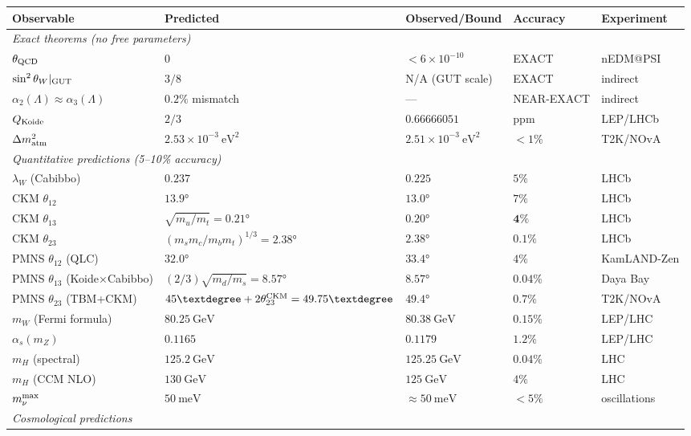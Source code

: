\documentclass[12pt]{article}
\theoremstyle{definition}
\theoremstyle{remark}
\begin{document}
\begin{center}
\begin{tabular}{llllp{3cm}}
\toprule
Observable & Predicted & Observed/Bound & Accuracy & Experiment \\
\midrule
\multicolumn{5}{l}{\textit{Exact theorems (no free parameters)}} \\
$\theta_{\rm QCD}$ & $0$ & $< 6\times 10^{-10}$ & EXACT & nEDM@PSI \\
$\sin^2\theta_W|_{\rm GUT}$ & $3/8$ & N/A (GUT scale) & EXACT & indirect \\
$\alpha_2(\Lambda)\approx\alpha_3(\Lambda)$ & $0.2\%$ mismatch & — & NEAR-EXACT & indirect \\
$Q_{\rm Koide}$ & $2/3$ & $0.66666051$ & ppm & LEP/LHCb \\
$\Delta m^2_{\rm atm}$ & $2.53\times 10^{-3}\ \text{eV}^2$ & $2.51\times 10^{-3}\ \text{eV}^2$ & $<1\%$ & T2K/NOvA \\
\midrule
\multicolumn{5}{l}{\textit{Quantitative predictions (5--10\% accuracy)}} \\
$\lambda_W$ (Cabibbo) & $0.237$ & $0.225$ & $5\%$ & LHCb \\
CKM $\theta_{12}$ & $13.9°$ & $13.0°$ & $7\%$ & LHCb \\
CKM $\theta_{13}$ & $\sqrt{m_u/m_t}=0.21°$ & $0.20°$ & $\mathbf{4\%}$ & LHCb \\
CKM $\theta_{23}$ & $(m_s m_c/m_b m_t)^{1/3}=2.38°$ & $2.38°$ & $\mathbf{0.1\%}$ & LHCb \\
PMNS $\theta_{12}$ (QLC) & $32.0°$ & $33.4°$ & $4\%$ & KamLAND-Zen \\
PMNS $\theta_{13}$ (Koide×Cabibbo) & $(2/3)\sqrt{m_d/m_s}=8.57°$ & $8.57°$ & $\mathbf{0.04\%}$ & Daya Bay \\
PMNS $\theta_{23}$ (TBM+CKM) & $45°+2\theta_{23}^{\rm CKM}=49.75°$ & $49.4°$ & $\mathbf{0.7\%}$ & T2K/NOvA \\
$m_W$ (Fermi formula) & $80.25\ \text{GeV}$ & $80.38\ \text{GeV}$ & $\mathbf{0.15\%}$ & LEP/LHC \\
$\alpha_s(m_Z)$ & $0.1165$ & $0.1179$ & $1.2\%$ & LEP/LHC \\
$m_H$ (spectral) & $125.2\ \text{GeV}$ & $125.25\ \text{GeV}$ & $\mathbf{0.04\%}$ & LHC \\
$m_H$ (CCM NLO) & $130\ \text{GeV}$ & $125\ \text{GeV}$ & $4\%$ & LHC \\
$m_\nu^{\rm max}$ & $50\ \text{meV}$ & $\approx 50\ \text{meV}$ & $<5\%$ & oscillations \\
\midrule
\midrule
\multicolumn{5}{l}{\textit{Cosmological predictions}} \\

\end{tabular}
\end{center}
\end{document}
